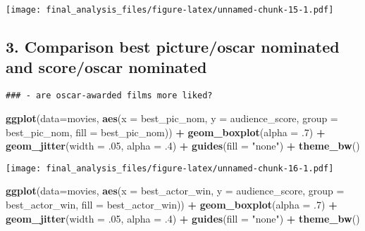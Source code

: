 \documentclass[]{article}
\newenvironment{Shaded}{\begin{snugshade}}{\end{snugshade}}
\newcommand{\DataTypeTok}[1]{\textcolor[rgb]{0.13,0.29,0.53}{#1}}
\newcommand{\FloatTok}[1]{\textcolor[rgb]{0.00,0.00,0.81}{#1}}
\newcommand{\KeywordTok}[1]{\textcolor[rgb]{0.13,0.29,0.53}{\textbf{#1}}}
\newcommand{\NormalTok}[1]{#1}
\newcommand{\OperatorTok}[1]{\textcolor[rgb]{0.81,0.36,0.00}{\textbf{#1}}}
\newcommand{\StringTok}[1]{\textcolor[rgb]{0.31,0.60,0.02}{#1}}
\begin{document}
\texttt{[image: final\_analysis\_files/figure-latex/unnamed-chunk-15-1.pdf]}

\hypertarget{comparison-best-pictureoscar-nominated-and-scoreoscar-nominated}{%
\subsection{3. Comparison best picture/oscar nominated and score/oscar
nominated}\label{comparison-best-pictureoscar-nominated-and-scoreoscar-nominated}}

\begin{verbatim}
### - are oscar-awarded films more liked?
\end{verbatim}

\begin{Shaded}
\begin{Highlighting}[]
\KeywordTok{ggplot}\NormalTok{(}\DataTypeTok{data=}\NormalTok{movies, }\KeywordTok{aes}\NormalTok{(}\DataTypeTok{x =}\NormalTok{ best_pic_nom, }\DataTypeTok{y =}\NormalTok{ audience_score, }\DataTypeTok{group =}\NormalTok{ best_pic_nom, }\DataTypeTok{fill =}\NormalTok{ best_pic_nom)) }\OperatorTok{+}\StringTok{ }\KeywordTok{geom_boxplot}\NormalTok{(}\DataTypeTok{alpha =} \FloatTok{.7}\NormalTok{) }\OperatorTok{+}\StringTok{ }\KeywordTok{geom_jitter}\NormalTok{(}\DataTypeTok{width =} \FloatTok{.05}\NormalTok{, }\DataTypeTok{alpha =} \FloatTok{.4}\NormalTok{) }\OperatorTok{+}\StringTok{ }\KeywordTok{guides}\NormalTok{(}\DataTypeTok{fill =} \StringTok{"none"}\NormalTok{) }\OperatorTok{+}\StringTok{ }\KeywordTok{theme_bw}\NormalTok{()}
\end{Highlighting}
\end{Shaded}

\texttt{[image: final\_analysis\_files/figure-latex/unnamed-chunk-16-1.pdf]}

\begin{Shaded}
\begin{Highlighting}[]
\KeywordTok{ggplot}\NormalTok{(}\DataTypeTok{data=}\NormalTok{movies, }\KeywordTok{aes}\NormalTok{(}\DataTypeTok{x =}\NormalTok{ best_actor_win, }\DataTypeTok{y =}\NormalTok{ audience_score, }\DataTypeTok{group =}\NormalTok{ best_actor_win, }\DataTypeTok{fill =}\NormalTok{ best_actor_win)) }\OperatorTok{+}\StringTok{ }\KeywordTok{geom_boxplot}\NormalTok{(}\DataTypeTok{alpha =} \FloatTok{.7}\NormalTok{) }\OperatorTok{+}\StringTok{ }\KeywordTok{geom_jitter}\NormalTok{(}\DataTypeTok{width =} \FloatTok{.05}\NormalTok{, }\DataTypeTok{alpha =} \FloatTok{.4}\NormalTok{) }\OperatorTok{+}\StringTok{ }\KeywordTok{guides}\NormalTok{(}\DataTypeTok{fill =} \StringTok{"none"}\NormalTok{) }\OperatorTok{+}\StringTok{ }\KeywordTok{theme_bw}\NormalTok{()}
\end{Highlighting}
\end{Shaded}
\end{document}
